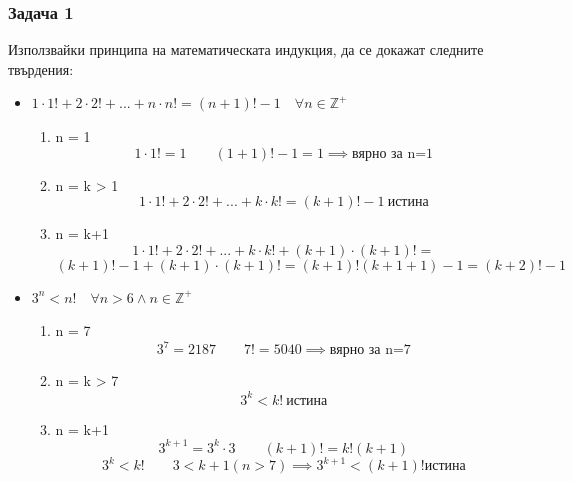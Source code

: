 \documentclass[fleqn, 12pt]{article}
\theoremstyle{definition}
\begin{document}
\subsubsection*{Задача 1}
Използвайки  принципа на  математическата  индукция,  да  се  докажат следните твърдения:
\begin{itemize}
\item $1\cdot 1! + 2\cdot 2! + ... + n\cdot n! = (n+1)! - 1 \quad \forall n \in \mathbb{Z}^+$
\begin{enumerate}
\item n = 1 
$$1\cdot 1! = 1 \qquad (1+1)! - 1 = 1 \implies \text{вярно за n=1}$$
\item n = k > 1 
$$1\cdot 1! + 2\cdot 2! + ... + k\cdot k! = (k+1)! - 1 \ \text{истина}$$
\item n = k+1 
$$1\cdot 1! + 2\cdot 2! + ... +k\cdot k! + (k+1)\cdot (k+1)! = $$
$$(k+1)! - 1 + (k+1)\cdot (k+1)! = (k+1)!(k+1+1) - 1 = (k+2)! - 1$$
\end{enumerate}
\item $3^n < n! \quad \forall n > 6 \land n \in \mathbb{Z}^+$
\begin{enumerate}
\item n = 7 
$$3^7 = 2187 \qquad 7! = 5040 \implies \text{вярно за n=7}$$
\item n = k > 7
$$3^k < k! \ \text{истина}$$
\item n = k+1 
$$3^{k+1} = 3^k \cdot 3 \qquad (k+1)! = k!(k+1)$$
$$3^k < k! \qquad 3<k+1 (n>7) \implies 3^{k+1} < (k+1)! \text{истина}$$
\end{enumerate}
\end{itemize}
\end{document}

